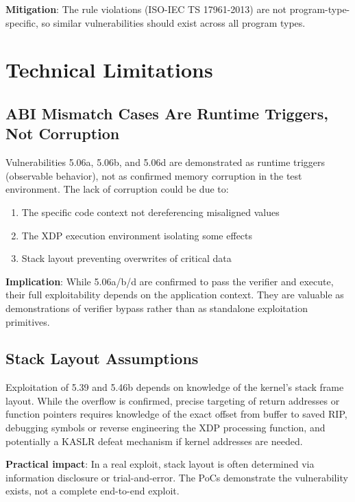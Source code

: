 \textbf{Mitigation}: The rule violations (ISO-IEC TS 17961-2013) are not program-type-specific, so similar vulnerabilities should exist across all program types.

\section{Technical Limitations}

\subsection{ABI Mismatch Cases Are Runtime Triggers, Not Corruption}

Vulnerabilities 5.06a, 5.06b, and 5.06d are demonstrated as runtime triggers (observable behavior), not as confirmed memory corruption in the test environment. The lack of corruption could be due to:
\begin{enumerate}[label=\arabic*.]
  \item The specific code context not dereferencing misaligned values
  \item The XDP execution environment isolating some effects
  \item Stack layout preventing overwrites of critical data
\end{enumerate}

\textbf{Implication}: While 5.06a/b/d are confirmed to pass the verifier and execute, their full exploitability depends on the application context. They are valuable as demonstrations of verifier bypass rather than as standalone exploitation primitives.

\subsection{Stack Layout Assumptions}

Exploitation of 5.39 and 5.46b depends on knowledge of the kernel's stack frame layout. While the overflow is confirmed, precise targeting of return addresses or function pointers requires knowledge of the exact offset from buffer to saved RIP, debugging symbols or reverse engineering the XDP processing function, and potentially a KASLR defeat mechanism if kernel addresses are needed.

\textbf{Practical impact}: In a real exploit, stack layout is often determined via information disclosure or trial-and-error. The PoCs demonstrate the vulnerability exists, not a complete end-to-end exploit.

